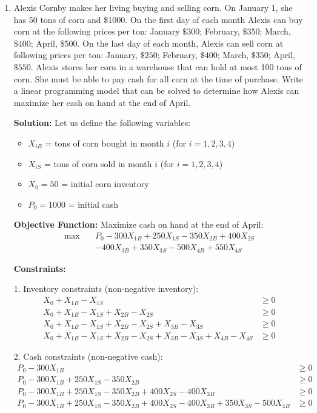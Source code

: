 \documentclass[11pt]{article}
\begin{document}
\begin{enumerate}
\begin{enumerate}
\item Alexis Cornby makes her living buying and selling corn. On January 1, she has 50 tons of corn and \$1000. On the first day of each month Alexis can buy corn at the following prices per ton: January $\$300$; February, $\$350$; March, $\$400$; April, $\$500$. On the last day of each month, Alexis can sell corn at following prices per ton: January, $\$250$; February, $\$400$; March, $\$350$; April, $\$550$. Alexis stores her corn in a warehouse that can hold at most 100 tons of corn. She must be able to pay cash for all corn at the time of purchase. Write a linear programming model that can be solved to determine how Alexis can maximize her cash on hand at the end of April.

\textbf{Solution:}
Let us define the following variables:
\begin{itemize}
    \item $X_{iB}$ = tons of corn bought in month $i$ (for $i = 1, 2, 3, 4$)
    \item $X_{iS}$ = tons of corn sold in month $i$ (for $i = 1, 2, 3, 4$)
    \item $X_0 = 50$ = initial corn inventory
    \item $P_0 = 1000$ = initial cash
\end{itemize}

\textbf{Objective Function:}
Maximize cash on hand at the end of April:
\begin{align*}
\max \quad & P_0 - 300X_{1B} + 250X_{1S} - 350X_{2B} + 400X_{2S} \\
& - 400X_{3B} + 350X_{3S} - 500X_{4B} + 550X_{4S}
\end{align*}

\textbf{Constraints:}

1. Inventory constraints (non-negative inventory):
\begin{align*}
X_0 + X_{1B} - X_{1S} &\geq 0 \\
X_0 + X_{1B} - X_{1S} + X_{2B} - X_{2S} &\geq 0 \\
X_0 + X_{1B} - X_{1S} + X_{2B} - X_{2S} + X_{3B} - X_{3S} &\geq 0 \\
X_0 + X_{1B} - X_{1S} + X_{2B} - X_{2S} + X_{3B} - X_{3S} + X_{4B} - X_{4S} &\geq 0
\end{align*}

2. Cash constraints (non-negative cash):
\begin{align*}
P_0 - 300X_{1B} &\geq 0 \\
P_0 - 300X_{1B} + 250X_{1S} - 350X_{2B} &\geq 0 \\
P_0 - 300X_{1B} + 250X_{1S} - 350X_{2B} + 400X_{2S} - 400X_{3B} &\geq 0 \\
P_0 - 300X_{1B} + 250X_{1S} - 350X_{2B} + 400X_{2S} - 400X_{3B} + 350X_{3S} - 500X_{4B} &\geq 0
\end{align*}


\end{enumerate}
\end{enumerate}
\end{document}
